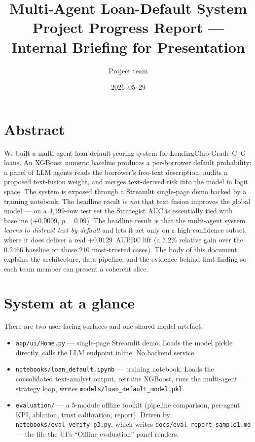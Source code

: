 \documentclass[11pt,letterpaper]{article}
\title{\vspace{-2em}\textbf{Multi-Agent Loan-Default System}\\
\large Project Progress Report --- Internal Briefing for Presentation}
\author{Project team}
\date{2026--05--29}
\begin{document}
\maketitle
\vspace{-1.5em}

\section*{Abstract}
We built a multi-agent loan-default scoring system for LendingClub Grade C--G
loans. An XGBoost numeric baseline produces a per-borrower default probability;
a panel of LLM agents reads the borrower's free-text description, audits a
proposed text-fusion weight, and merges text-derived risk into the model in
logit space. The system is exposed through a Streamlit single-page demo
backed by a training notebook. The headline result is \emph{not} that text
fusion improves the global model --- on a 4{,}199-row test set the Strategist
AUC is essentially tied with baseline ($+0.0009$, $p = 0.09$). The headline
result is that the multi-agent system \emph{learns to distrust text by
default} and lets it act only on a high-confidence subset, where it does
deliver a real \mbox{$+0.0129$ AUPRC} lift (a $5.2\%$ relative gain over
the $0.2466$ baseline on those 210 most-trusted cases). The body of this document
explains the architecture, data pipeline, and the evidence behind that
finding so each team member can present a coherent slice.

\section{System at a glance}
There are two user-facing surfaces and one shared model artefact:

\begin{itemize}
  \item \texttt{app/ui/Home.py} --- single-page Streamlit demo. Loads the
        model pickle directly, calls the LLM endpoint inline. No backend
        service.
  \item \texttt{notebooks/loan\_default.ipynb} --- training notebook. Loads
        the consolidated text-analyst output, retrains XGBoost, runs the
        multi-agent strategy loop, writes \texttt{models/loan\_default\_model.pkl}.
  \item \texttt{evaluation/} --- a 5-module offline toolkit (pipeline
        comparison, per-agent KPI, ablation, trust calibration, report).
        Driven by \texttt{notebooks/eval\_verify\_p3.py}, which writes
        \texttt{docs/eval\_report\_sample1.md} --- the file the UI's
        ``Offline evaluation'' panel renders.
\end{itemize}
\end{document}
